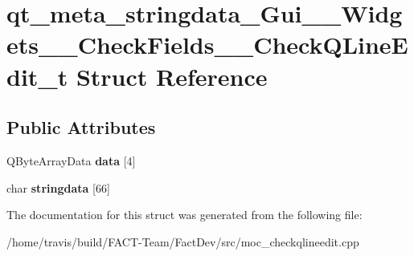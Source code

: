 \hypertarget{structqt__meta__stringdata__Gui____Widgets____CheckFields____CheckQLineEdit__t}{\section{qt\-\_\-meta\-\_\-stringdata\-\_\-\-Gui\-\_\-\-\_\-\-Widgets\-\_\-\-\_\-\-Check\-Fields\-\_\-\-\_\-\-Check\-Q\-Line\-Edit\-\_\-t Struct Reference}
\label{structqt__meta__stringdata__Gui____Widgets____CheckFields____CheckQLineEdit__t}
}
\subsection*{Public Attributes}
\begin{DoxyCompactItemize}
\item 
\hypertarget{structqt__meta__stringdata__Gui____Widgets____CheckFields____CheckQLineEdit__t_ac73edc34331a4bd7e37a45f4f882c930}{Q\-Byte\-Array\-Data {\bfseries data} \mbox{[}4\mbox{]}}\label{structqt__meta__stringdata__Gui____Widgets____CheckFields____CheckQLineEdit__t_ac73edc34331a4bd7e37a45f4f882c930}

\item 
\hypertarget{structqt__meta__stringdata__Gui____Widgets____CheckFields____CheckQLineEdit__t_a70a6388c4f20dda3c9ad273937cd386e}{char {\bfseries stringdata} \mbox{[}66\mbox{]}}\label{structqt__meta__stringdata__Gui____Widgets____CheckFields____CheckQLineEdit__t_a70a6388c4f20dda3c9ad273937cd386e}

\end{DoxyCompactItemize}


The documentation for this struct was generated from the following file\-:\begin{DoxyCompactItemize}
\item 
/home/travis/build/\-F\-A\-C\-T-\/\-Team/\-Fact\-Dev/src/moc\-\_\-checkqlineedit.\-cpp\end{DoxyCompactItemize}
